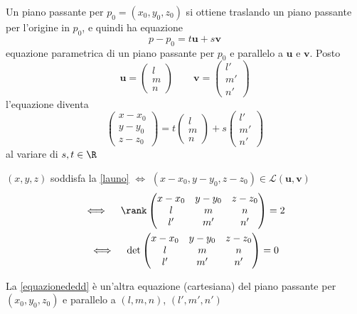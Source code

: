 Un piano passante per $ p_0=(x_0, y_0, z_0) $ si ottiene traslando un piano passante per l'origine in $ p_0 $, e quindi ha equazione \[
    p-p_0=t\mathbf{u}+s\mathbf{v}
\]
equazione parametrica di un piano passante per $ p_0 $ e parallelo a $ \mathbf{u} $ e $ \mathbf{v} $. Posto \[
    \mathbf{u}=\begin{pmatrix}
        l\\m\\n
    \end{pmatrix}\qquad \mathbf{v}=\begin{pmatrix}
        l'\\m'\\n'
    \end{pmatrix}
\]
l'equazione diventa
\begin{equation}
    \begin{pmatrix}
        x-x_0\\ y-y_0\\ z-z_0
    \end{pmatrix}=t \begin{pmatrix}
        l\\m\\n
    \end{pmatrix}+s\begin{pmatrix}
        l'\\m'\\n'
    \end{pmatrix}\label{launo}
\end{equation}
al variare di $ s, t \in \R $

$ (x,y,z) $ soddisfa la \eqref{launo} $ \iff $ $ (x-x_0, y-y_0, z-z_0) \in \mathscr{L}(\mathbf{u}, \mathbf{v}) $
\begin{gather}
    \iff \quad\rank \begin{pmatrix}
        x-x_0 & y-y_0 & z-z_0\\
        l & m &n \\
        l' & m' & n'
    \end{pmatrix}=2\\
    \iff\quad \det\begin{pmatrix}
        x-x_0 & y-y_0 & z-z_0\\
        l & m &n \\
        l' & m' & n'
    \end{pmatrix}=0\label{equazionededd}
\end{gather} %

La \eqref{equazionededd} è un'altra equazione (cartesiana) del piano passante per $ (x_0, y_0, z_0) $ e parallelo a $ (l, m, n) $, $ (l', m', n') $

